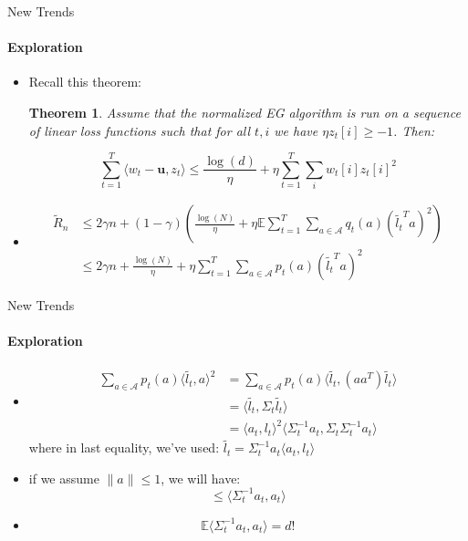 \documentclass{beamer}
\newtheorem{thm}{Theorem}
\newcommand{\E}{\mathbb{E}}
\newcommand{\uu}{\mathbf{u}}
\begin{document}
\begin{frame}{New Trends}
\framesubtitle{Exploration}

\begin{itemize}

\item 
Recall this theorem:
\begin{thm}
Assume that the normalized EG algorithm is run on a sequence of linear loss functions such that for all $t, i$ we have $\eta z_t[i] \geq -1$.
Then:

$$
\sum_{t=1}^T  \langle w_t-\uu , z_t \rangle \leq \frac{\log(d)}{\eta}  + \eta \sum_{t=1}^T \sum_i w_t[i] z_t[i]^2$$
\end{thm}

\pause

\item
\begin{align*}
\tilde{R}_n &\leq 2 \gamma n + (1- \gamma)(\frac{\log(N)}{\eta}  + \eta \E \sum_{t=1}^T \sum_{a \in \mathcal{A}}  q_t(a) (\tilde{l_t}^T a)^2)\\
& \leq 2 \gamma n + \frac{\log(N)}{\eta}  + \eta \sum_{t=1}^T \sum_{a \in \mathcal{A}}  p_t(a) (\tilde{l_t}^T a)^2
\end{align*}
\end{itemize}
\end{frame}

\begin{frame}{New Trends}
\framesubtitle{Exploration}
\begin{itemize}
\item 
\begin{align*}
\sum_{a \in \mathcal{A}}  p_t(a) \langle \tilde{l_t}, a \rangle ^2 &= \sum_{a \in \mathcal{A}}  p_t(a) \langle \tilde{l_t}, (a a^T) \tilde{l_t} \rangle\\
&= \langle \tilde{l_t}, \Sigma_t \tilde{l_t} \rangle\\
&=  \langle a_t, l_t \rangle ^2 \langle \Sigma_t^{-1} a_t, \Sigma_t \Sigma_t^{-1} a_t \rangle
\end{align*}
where in last equality, we've used: $\tilde{l_t}= \Sigma_t^{-1} a_t \langle a_t, l_t \rangle$

\pause

\item
if we assume $\|a \| \leq 1$, we will have:
$$ \leq \langle \Sigma_t^{-1} a_t,  a_t \rangle$$

\pause

\item
$$\E \langle \Sigma_t^{-1} a_t,  a_t \rangle= d!$$

\end{itemize}
\end{frame}
\end{document}
